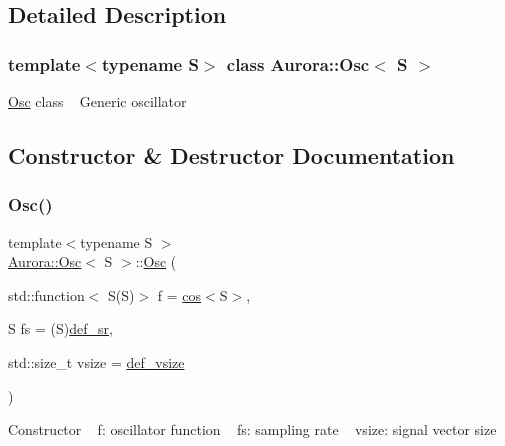 \subsection{Detailed Description}
\subsubsection*{template$<$typename S$>$\newline
class Aurora\+::\+Osc$<$ S $>$}

\hyperlink{class_aurora_1_1_osc}{Osc} class ~\newline
Generic oscillator 

\subsection{Constructor \& Destructor Documentation}
\mbox{\label{class_aurora_1_1_osc_ac97decabac1a41e2556039548f8feab4}} 
\subsubsection{\texorpdfstring{Osc()}{Osc()}}
{\footnotesize\ttfamily template$<$typename S $>$ \\
\hyperlink{class_aurora_1_1_osc}{Aurora\+::\+Osc}$<$ S $>$\+::\hyperlink{class_aurora_1_1_osc}{Osc} (\begin{DoxyParamCaption}\item[{std\+::function$<$ S(S)$>$}]{f = {\ttfamily \hyperlink{namespace_aurora_ab6ef1b966b8f27d107fcabe1027a677a}{cos}$<$S$>$},  }\item[{S}]{fs = {\ttfamily (S)\hyperlink{namespace_aurora_ad49263d809bea98dd422e95bc91bc03e}{def\+\_\+sr}},  }\item[{std\+::size\+\_\+t}]{vsize = {\ttfamily \hyperlink{namespace_aurora_afaaddf667a06e7ce23c667a8b7295263}{def\+\_\+vsize}} }\end{DoxyParamCaption})\hspace{0.3cm}{\ttfamily [inline]}}

Constructor ~\newline
f\+: oscillator function ~\newline
fs\+: sampling rate ~\newline
vsize\+: signal vector size \mbox{\label{class_aurora_1_1_osc_a95062ac1670f5de00a27c33bfb4eb117}} 
